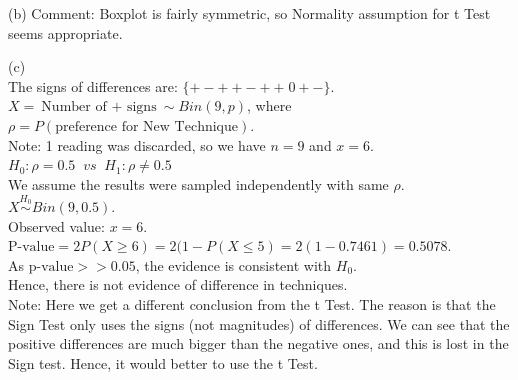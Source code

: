\documentclass[bigtut]{tutorial}\usepackage[]{graphicx}\usepackage[]{color}
\begin{document}
\begin{tutorial}
\begin{questions}
\begin{solution}
(b)
Comment: Boxplot is fairly symmetric, so Normality assumption for t Test seems appropriate. 


(c)
 \\
The signs of differences are: 
$\{ + - + + - + +  \; 0 +  -\}$. \\

$X = \text{Number of $+$ signs} \sim Bin(9, p)$, where $\rho = P(\text{preference for New Technique})$. \\
Note: 1 reading was discarded, so we have $n= 9$ and $x=6$. \\

$H_0: \rho=0.5  \;\; vs \;\; H_1: \rho \neq 0.5$ \\

 We assume the results were sampled independently with same $\rho$. \\

$X \overset{H_0}{\sim} Bin(9,0.5)$.\\
Observed value: $x=6$. \\

$\text{P-value} = 2 P(X \geq 6) = 2(1- P(X \leq 5) 
= 2(1- 0.7461) =  0.5078$. \\

 As $\text{p-value} >> 0.05$, the evidence is consistent with $H_{0}$. \\
Hence, there is not evidence of difference in techniques. \\

Note: Here we get a different conclusion from the t Test. The reason is that the Sign Test only uses the signs (not magnitudes) of differences. We can see that the positive differences are much bigger than the negative ones, and this is lost in the Sign test. Hence, it would better to use the t Test.
\end{solution}



\end{questions}
\end{tutorial}
\end{document}
